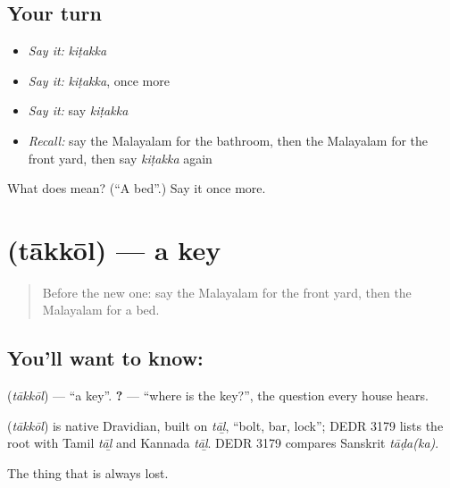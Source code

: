 \subsection*{Your turn}
\begin{itemize}
\raggedright
  \item \emph{Say it:} \emph{kiṭakka}
  \item \emph{Say it:} \emph{kiṭakka}, once more
  \item \emph{Say it:} say \emph{kiṭakka}
  \item \emph{Recall:} say the Malayalam for the bathroom, then the Malayalam for the front yard, then say \emph{kiṭakka} again
\end{itemize}

\begin{tcolorbox}[breakable,colback=teal!4,colframe=teal!35!black,title={Before you move on}]
What does  mean? (\textquotedblleft{}A bed\textquotedblright{}.) Say it once more.
\end{tcolorbox}
\section[\texorpdfstring{\ml{താക്കോൽ} (tākkōl)}{താക്കോൽ (tākkōl)}]{ (tākkōl) — a key}

\label{lesson:ML-C129-key}



\begin{quote}
Before the new one: say the Malayalam for the front yard, then the Malayalam for a bed.
\end{quote}

\subsection*{You'll want to know: }
\textbf{} (\emph{tākkōl}) — \textquotedblleft{}a key\textquotedblright{}. \textbf{ ?} — \textquotedblleft{}where is the key?\textquotedblright{}, the question every house hears.

\begin{cousinweb}
\textbf{} (\emph{tākkōl}) is native Dravidian, built on \emph{tāḻ}, \textquotedblleft{}bolt, bar, lock\textquotedblright{}; DEDR 3179 lists the root with Tamil \emph{tāḻ} and Kannada \emph{tāḻ}. DEDR 3179 compares Sanskrit \emph{tāḍa(ka)}.
\end{cousinweb}

\begin{grammarlens}[title={What you've built}]
The thing that is always lost.
\end{grammarlens}


